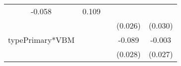 \documentclass[12pt,twoside]{reedthesis}
\begin{document}
\begin{longtable}[]{@{}ccccc@{}}
\begin{minipage}[t]{0.12\columnwidth}
  -0.058\strut
  \end{minipage} & \begin{minipage}[t]{0.12\columnwidth}\centering\strut
  0.109\strut
  \end{minipage}\tabularnewline
  \begin{minipage}[t]{0.26\columnwidth}\centering\strut
  \strut
  \end{minipage} & \begin{minipage}[t]{0.12\columnwidth}\centering\strut
  \strut
  \end{minipage} & \begin{minipage}[t]{0.12\columnwidth}\centering\strut
  \strut
  \end{minipage} & \begin{minipage}[t]{0.12\columnwidth}\centering\strut
  (0.026)\strut
  \end{minipage} & \begin{minipage}[t]{0.12\columnwidth}\centering\strut
  (0.030)\strut
  \end{minipage}\tabularnewline
  \begin{minipage}[t]{0.26\columnwidth}\centering\strut
  typePrimary*VBM\strut
  \end{minipage} & \begin{minipage}[t]{0.12\columnwidth}\centering\strut
  \strut
  \end{minipage} & \begin{minipage}[t]{0.12\columnwidth}\centering\strut
  \strut
  \end{minipage} & \begin{minipage}[t]{0.12\columnwidth}\centering\strut
  -0.089\strut
  \end{minipage} & \begin{minipage}[t]{0.12\columnwidth}\centering\strut
  -0.003\strut
  \end{minipage}\tabularnewline
  \begin{minipage}[t]{0.26\columnwidth}\centering\strut
  \strut
  \end{minipage} & \begin{minipage}[t]{0.12\columnwidth}\centering\strut
  \strut
  \end{minipage} & \begin{minipage}[t]{0.12\columnwidth}\centering\strut
  \strut
  \end{minipage} & \begin{minipage}[t]{0.12\columnwidth}\centering\strut
  (0.028)\strut
  \end{minipage} & \begin{minipage}[t]{0.12\columnwidth}\centering\strut
  (0.027)\strut
  \end{minipage}\tabularnewline
  \bottomrule
  \end{longtable}
  
\end{document}
